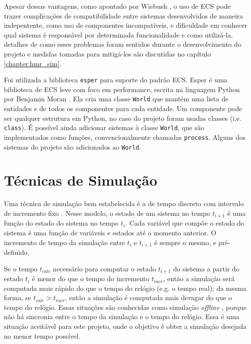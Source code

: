 Apesar dessas vantagens, como apontado por Wiebush \cite{wiebusch2015decoupling}, o uso de ECS pode trazer complicações de compatibilidade entre sistemas desenvolvidos de maneira indepentente, como uso de componentes incompatíveis, e dificuldade em conhecer qual sistema é responsável por determinada funcionalidade e como utilizá-la. detalhes de como esses problemas foram sentidos durante o desenvolvimento do projeto e medidas tomadas para mitigá-los são discutidas no capítulo \ref{chapter:hmr_sim}.

Foi utilizada a biblioteca \texttt{esper} para suporte do padrão ECS. Esper é uma biblioteca de ECS leve com foco em performance, escrita na linguagem Python por Benjamin Moran \cite{esper}. Ela cria uma classe \texttt{World} que mantém uma lista de entidades e de todos os componentes para cada entidade. Um componente pode ser qualquer estrutura em Python, no caso do projeto foram usadas classes (i.e. \texttt{class}). É possível ainda adicionar sistemas à classe \texttt{World}, que são implementados como funções, convencionalmente chamadas \texttt{process}. Alguns dos sistemas do projeto são adicionados ao \texttt{World}.

\section{Técnicas de Simulação}
\label{sec:simulation_techniques}

Uma técnica de simulação bem estabelecida é a de tempo discreto com intervalo de incremento fixo \cite{belanger2010aboutsimulation}. Nesse modelo, o estado de um sistema no tempo $t_{i+1}$ é uma função do estado do sistema no tempo $t_i$. Cada variável que compõe o estado do sistema é uma função de variáveis e estados até o momento anterior. O incremento de tempo da simulação entre $t_i$ e $t_{i+1}$ é sempre o mesmo, e pré-definido.

Se o tempo $t_{calc}$ necessário para computar o estado $t_{i+1}$ do sistema a partir do estado $t_i$ é menor do que o tempo do incremento $t_{incr}$, então a simulação será computada mais rápido do que o tempo do relógio (e.g. o tempo real); da mesma forma, se $t_{calc} > t_{incr}$, então a simulação é computada mais devagar do que o tempo do relógio. Essas situações são conhecidas como simulação \textit{offline} \cite{belanger2010aboutsimulation}, porque não há sincronia entre o tempo da simulação e o tempo do relógio. Essa é uma situação aceitável para este projeto, onde o objetivo é obter a simulação desejada no menor tempo possível.

